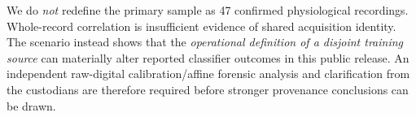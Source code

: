 We do \emph{not} redefine the primary sample as 47 confirmed
physiological recordings. Whole-record correlation is
insufficient evidence of shared acquisition identity.
The scenario instead shows that the \emph{operational
definition of a disjoint training source} can materially
alter reported classifier outcomes in this public release.
An independent raw-digital calibration/affine forensic analysis
and clarification from the custodians are therefore required
before stronger provenance conclusions can be drawn.
